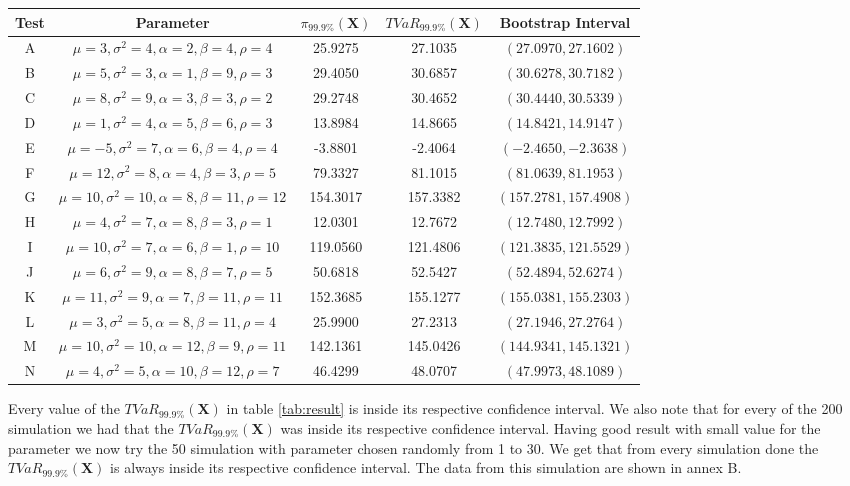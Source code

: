 \documentclass[12pt,travaildirige,nobabel, twoside]{dms}
\numberwithin{equation}{section}
\numberwithin{table}{chapter}
\numberwithin{figure}{chapter}
\begin{document}
\begin {table}[h]
\begin{adjustbox}{width=1.1\textwidth}
\begin{tabular}{|c|c|c|c|c|}
   \hline
   Test & Parameter & $\pi_{99.9\%}(\textbf{X})$ & $TVaR_{99.9\%}(\textbf{X})$ & Bootstrap Interval \\
   \hline
   A & $ \mu=3,\sigma^2=4,\alpha=2,\beta=4,\rho=4$ & 25.9275 & 27.1035 & $( 27.0970,
   27.1602)$\\
  \hline
   B & $ \mu=5,\sigma^2=3,\alpha=1,\beta=9,\rho=3$ & 29.4050 & 30.6857 & $( 30.6278,
   30.7182)$ \\
   \hline
   C & $ \mu=8,\sigma^2=9,\alpha=3,\beta=3,\rho=2$ & 29.2748 & 30.4652 & $( 30.4440,
  30.5339)$ \\
   \hline
   D & $ \mu=1,\sigma^2=4,\alpha=5,\beta=6,\rho=3$ & 13.8984 & 14.8665 & $( 14.8421,
   14.9147)$ \\
   \hline
   E & $ \mu=-5,\sigma^2=7,\alpha=6,\beta=4,\rho=4$ & -3.8801 & -2.4064 & $( -2.4650,
   -2.3638)$ \\
   \hline
   F & $ \mu=12,\sigma^2=8,\alpha=4,\beta=3,\rho=5$ & 79.3327 & 81.1015 & $( 81.0639,
   81.1953)$ \\
   \hline
   	G& $ \mu=10,\sigma^2=10,\alpha=8,\beta=11,\rho=12$ &  154.3017 &   157.3382 & $(157.2781,157.4908)$ \\   
   	\hline
	H& $ \mu=4,\sigma^2=7,\alpha=8,\beta=3,\rho=1$ &  12.0301 &   12.7672 & $(12.7480,12.7992)$ \\  
	 \hline
	I& $ \mu=10,\sigma^2=7,\alpha=6,\beta=1,\rho=10$ &  119.0560 &   121.4806 & $(121.3835,121.5529)$ \\   
	\hline
	J& $ \mu=6,\sigma^2=9,\alpha=8,\beta=7,\rho=5$ &  50.6818 &   52.5427 & $(52.4894,52.6274)$ \\   
	\hline
	K& $ \mu=11,\sigma^2=9,\alpha=7,\beta=11,\rho=11$ &  152.3685 &   155.1277 & $(155.0381,155.2303)$ \\   
	\hline
	L& $ \mu=3,\sigma^2=5,\alpha=8,\beta=11,\rho=4$ &  25.9900 &   27.2313 & $(27.1946,27.2764)$ \\   
	\hline
	M& $ \mu=10,\sigma^2=10,\alpha=12,\beta=9,\rho=11$ &  142.1361 &   145.0426 & $(144.9341,145.1321)$ \\   
	\hline
	N& $ \mu=4,\sigma^2=5,\alpha=10,\beta=12,\rho=7$ &  46.4299 &   48.0707 &$(47.9973,48.1089)$ \\   
	\hline
\end{tabular}
\end{adjustbox}


\end {table}

Every value of the $TVaR_{99.9\%}(\textbf{X})$ in table \ref{tab:result} is inside its respective confidence interval. We also note that for every of the 200 simulation we had that the $TVaR_{99.9\%}(\textbf{X})$ was inside its respective confidence interval. Having good result with small value for the parameter we now try the 50 simulation with parameter chosen randomly from 1 to 30. We get that from every simulation done the $TVaR_{99.9\%}(\textbf{X})$ is always inside its respective confidence interval. The data from this simulation are shown in annex B.\\
\end{document}
